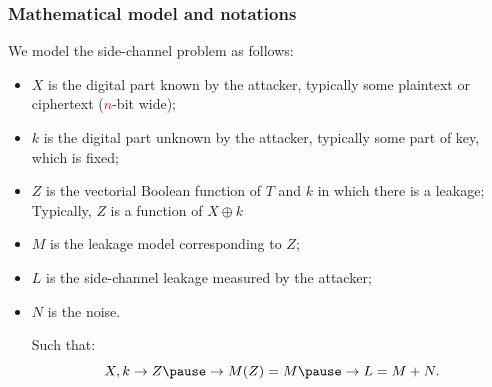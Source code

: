 \documentclass{beamer}
\begin{document}
\begin{frame}

\frametitle{Mathematical model and notations}
We model the side-channel problem as follows:

\begin{itemize}
\item $X$ is the digital part known by the attacker, typically some plaintext or ciphertext (\textcolor{red}{$n$}-bit wide);
\pause \item $k$ is the digital part unknown by the attacker, typically some part of key, which is fixed;
\pause \item $Z$ is the vectorial Boolean function of $T$ and $k$ in which there is a leakage; Typically, $Z$ is a function of $X\oplus k$
\pause \item $M$ is the leakage model corresponding to $Z$;
\pause \item $L$ is the side-channel leakage measured by the attacker;
\pause \item $N$ is the noise.
\pause 

Such that:
\begin{equation*}
X,k \rightarrow
Z \pause 
\rightarrow
M(Z) = M \pause
\rightarrow
L = M+N .
\label{eqn-markov_chain}
\end{equation*}
\end{itemize}


\end{frame}
\end{document}
